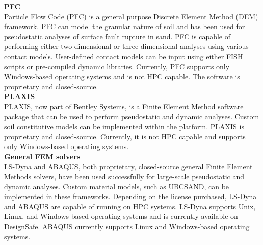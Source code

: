 \noindent\textbf{PFC}\\
Particle Flow Code (PFC) is a general purpose Discrete Element Method (DEM) framework. PFC can model the granular nature of soil and has been used for pseudostatic analyses of surface fault rupture in sand. PFC is capable of performing either two-dimensional or three-dimensional analyses using various contact models. User-defined contact models can be input using either FISH scripts or pre-compiled dynamic libraries. Currently, PFC supports only Windows-based operating systems and is not HPC capable. The software is proprietary and closed-source.\\

\noindent\textbf{PLAXIS}\\
PLAXIS, now part of Bentley Systems, is a Finite Element Method software package that can be used to perform pseudostatic and dynamic analyses. Custom soil constitutive models can be implemented within the platform. PLAXIS is proprietary and closed-source. Currently, it is not HPC capable and supports only Windows-based operating systems.\\

\noindent\textbf{General FEM solvers}\\
LS-Dyna and ABAQUS, both proprietary, closed-source general Finite Element Methods solvers, have been used successfully for large-scale pseudostatic and dynamic analyses. Custom material models, such as UBCSAND, can be implemented in these frameworks. Depending on the license purchased, LS-Dyna and ABAQUS are capable of running on HPC systems. LS-Dyna supports Unix, Linux, and Windows-based operating systems and is currently available on DesignSafe. ABAQUS currently supports Linux and Windows-based operating systems.



